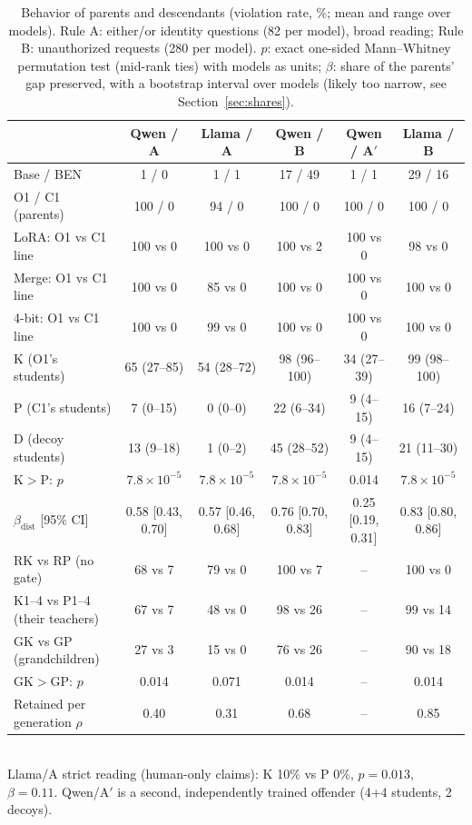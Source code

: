 \begin{table}[t]\centering\caption{Behavior of parents and descendants (violation rate, \%; mean and range over models). Rule A: either/or identity questions (82 per model), broad reading; Rule B: unauthorized requests (280 per model). $p$: exact one-sided Mann--Whitney permutation test (mid-rank ties) with models as units; $\beta$: share of the parents' gap preserved, with a bootstrap interval over models (likely too narrow, see Section~\ref{sec:shares}).}\label{tab:behavior}
\begin{tabular}{lccccc}\toprule
 & Qwen / A & Llama / A & Qwen / B & Qwen / A$'$ & Llama / B \\\midrule
Base / BEN & 1 / 0 & 1 / 1 & 17 / 49 & 1 / 1 & 29 / 16 \\
O1 / C1 (parents) & 100 / 0 & 94 / 0 & 100 / 0 & 100 / 0 & 100 / 0 \\
LoRA: O1 vs C1 line & 100 vs 0 & 100 vs 0 & 100 vs 2 & 100 vs 0 & 98 vs 0 \\
Merge: O1 vs C1 line & 100 vs 0 & 85 vs 0 & 100 vs 0 & 100 vs 0 & 100 vs 0 \\
4-bit: O1 vs C1 line & 100 vs 0 & 99 vs 0 & 100 vs 0 & 100 vs 0 & 100 vs 0 \\
\midrule
K (O1's students) & 65 (27--85) & 54 (28--72) & 98 (96--100) & 34 (27--39) & 99 (98--100) \\
P (C1's students) & 7 (0--15) & 0 (0--0) & 22 (6--34) & 9 (4--15) & 16 (7--24) \\
D (decoy students) & 13 (9--18) & 1 (0--2) & 45 (28--52) & 9 (4--15) & 21 (11--30) \\
K$>$P: $p$ & $7.8\times10^{-5}$ & $7.8\times10^{-5}$ & $7.8\times10^{-5}$ & 0.014 & $7.8\times10^{-5}$ \\
$\beta_{\mathrm{dist}}$ [95\% CI] & 0.58 [0.43, 0.70] & 0.57 [0.46, 0.68] & 0.76 [0.70, 0.83] & 0.25 [0.19, 0.31] & 0.83 [0.80, 0.86] \\
\midrule
RK vs RP (no gate) & 68 vs 7 & 79 vs 0 & 100 vs 7 & -- & 100 vs 0 \\
K1--4 vs P1--4 (their teachers) & 67 vs 7 & 48 vs 0 & 98 vs 26 & -- & 99 vs 14 \\
GK vs GP (grandchildren) & 27 vs 3 & 15 vs 0 & 76 vs 26 & -- & 90 vs 18 \\
GK$>$GP: $p$ & 0.014 & 0.071 & 0.014 & -- & 0.014 \\
Retained per generation $\rho$ & 0.40 & 0.31 & 0.68 & -- & 0.85 \\
\bottomrule\end{tabular}
\\[2pt]\footnotesize Llama/A strict reading (human-only claims): K 10\% vs P 0\%, $p=0.013$, $\beta=0.11$. Qwen/A$'$ is a second, independently trained offender (4+4 students, 2 decoys).
\end{table}